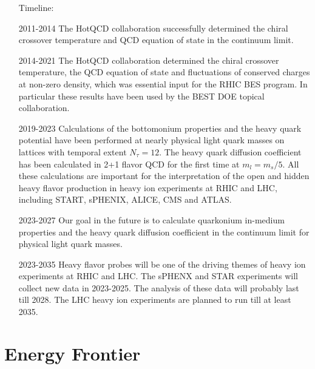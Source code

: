 \documentclass[12pt]{article}
\begin{document}
\begin{itemize}
  \item[Timeline:]
   \item[2011-2014] The HotQCD collaboration successfully determined
     the chiral crossover temperature and QCD equation of state in the
     continuum limit. 
   \item[2014-2021] The HotQCD collaboration determined the chiral
     crossover temperature, the QCD equation of state and fluctuations
     of conserved charges at non-zero density, which was essential
     input for the RHIC BES program. In particular these results have
     been used by the BEST DOE topical collaboration.
   \item[2019-2023] Calculations of the bottomonium properties and the
     heavy quark potential have been performed at nearly physical
     light quark masses on lattices with temporal extent
     $N_{\tau}=12$. The heavy quark diffusion coefficient has been
     calculated in 2+1 flavor QCD for the first time at
     $m_l=m_s/5$. All these calculations are important for the
     interpretation of the open and hidden heavy flavor production in
     heavy ion experiments at RHIC and LHC, including START, sPHENIX,
     ALICE, CMS and ATLAS.
   \item[2023-2027] Our goal in the future is to calculate quarkonium
     in-medium properties and the heavy quark diffusion coefficient in
     the continuum limit for physical light quark masses.
   \item[2023-2035] Heavy flavor probes will be one of the driving
     themes of heavy ion experiments at RHIC and LHC. The sPHENX and
     STAR experiments will collect new data in 2023-2025. The analysis
     of these data will probably last till 2028. The LHC heavy ion
     experiments are planned to run till at least 2035. 
\end{itemize}


\section{Energy Frontier}\label{sec:energy}


\newpage

\appendix



\end{document}
